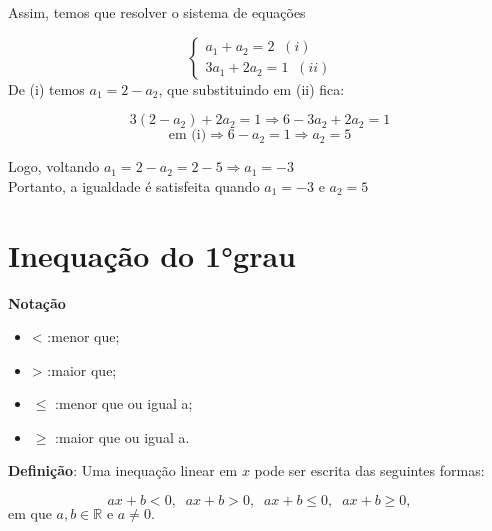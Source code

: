 \begin{enumerate}
			Assim, temos que resolver o sistema de equações
   
			\begin{equation*}
				\ \begin{cases}
					a_1+a_2 = 2 \;\; (i) \\
					3a_1+2a_2 = 1 \;\; (ii)
				\end{cases}
			\end{equation*}
			De  (i) temos $a_1 = 2 - a_2$, que substituindo em  (ii) fica:
			
			\[ 
            3(2-a_2)+2a_2 = 1 \Longrightarrow 6-3a_2+2a_2=1 
            \]
			\[ 
            \text{em (i)}\Longrightarrow 6-a_2=1 \Longrightarrow a_2 = 5
            \]
            
			Logo, voltando $a_1 = 2-a_2 = 2-5 \Longrightarrow a_1 = -3$ \\
			Portanto, a igualdade é satisfeita quando $a_1 = -3$ e $a_2 = 5$  \\
			\begin{center}
			\end{center}
	\end{enumerate}
	
	\section{Inequação do 1°grau}

    \noindent
	\textbf{Notação}
	\begin{itemize}
		\item {\Large <} :\;menor que;
		\item {\Large >} :\;maior que;
		\item {\Large $\le$} :\;menor que ou igual a;
		\item {\Large $\ge$} :\;maior que ou igual a.
	\end{itemize}

    \noindent
	\textbf{Definição}: Uma inequação linear em $x$ pode ser escrita das seguintes formas:

    \begin{tcolorbox}[colback=white,colframe=minha_cor,coltitle=black,title=Definição] 
        \begin{center}
        \begin{minipage}{0.6\textwidth}
        \[
        ax+b < 0, \;\; ax+b > 0, \;\; ax+b \le 0, \;\; ax+b \ge 0,
        \]
        $\text{em que }a, b \in \mathbb{R} \text{ e } a \neq 0.$
        \end{minipage}
        \end{center}
    \end{tcolorbox}
    
